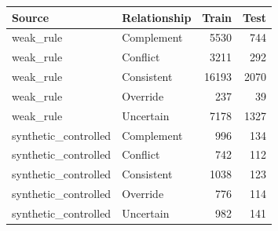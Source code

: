 \begin{tabular}{llrr}
\toprule
Source & Relationship & Train & Test \\
\midrule
weak\_rule & Complement & 5530 & 744 \\
weak\_rule & Conflict & 3211 & 292 \\
weak\_rule & Consistent & 16193 & 2070 \\
weak\_rule & Override & 237 & 39 \\
weak\_rule & Uncertain & 7178 & 1327 \\
synthetic\_controlled & Complement & 996 & 134 \\
synthetic\_controlled & Conflict & 742 & 112 \\
synthetic\_controlled & Consistent & 1038 & 123 \\
synthetic\_controlled & Override & 776 & 114 \\
synthetic\_controlled & Uncertain & 982 & 141 \\
\bottomrule
\end{tabular}
